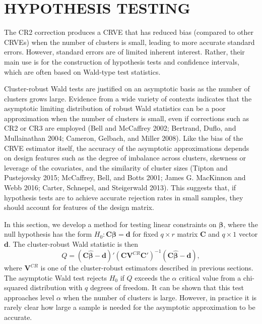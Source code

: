 \documentclass[12pt]{article}
\begin{document}
\hypertarget{sec:testing}{%
\section{HYPOTHESIS TESTING}\label{sec:testing}}

The CR2 correction produces a CRVE that has reduced bias (compared to
other CRVEs) when the number of clusters is small, leading to more
accurate standard errors. However, standard errors are of limited
inherent interest. Rather, their main use is for the construction of
hypothesis tests and confidence intervals, which are often based on
Wald-type test statistics.

Cluster-robust Wald tests are justified on an asymptotic basis as the
number of clusters grows large. Evidence from a wide variety of contexts
indicates that the asymptotic limiting distribution of robust Wald
statistics can be a poor approximation when the number of clusters is
small, even if corrections such as CR2 or CR3 are employed (Bell and
McCaffrey 2002; Bertrand, Duflo, and Mullainathan 2004; Cameron,
Gelbach, and Miller 2008). Like the bias of the CRVE estimator itself,
the accuracy of the asymptotic approximations depends on design features
such as the degree of imbalance across clusters, skewness or leverage of
the covariates, and the similarity of cluster sizes (Tipton and
Pustejovsky 2015; McCaffrey, Bell, and Botts 2001; James G. MacKinnon
and Webb 2016; Carter, Schnepel, and Steigerwald 2013). This suggests
that, if hypothesis tests are to achieve accurate rejection rates in
small samples, they should account for features of the design matrix.

In this section, we develop a method for testing linear constraints on
\(\boldsymbol\beta\), where the null hypothesis has the form
\(H_0: \mathbf{C}\boldsymbol\beta = \mathbf{d}\) for fixed
\(q \times r\) matrix \(\mathbf{C}\) and \(q \times 1\) vector
\(\mathbf{d}\). The cluster-robust Wald statistic is then
\begin{equation}
\label{eq:Wald_stat}
Q = \left(\mathbf{C}\boldsymbol{\hat\beta} - \mathbf{d}\right)'\left(\mathbf{C} \mathbf{V}^{CR} \mathbf{C}'\right)^{-1}\left(\mathbf{C}\boldsymbol{\hat\beta} - \mathbf{d}\right),
\end{equation} where \(\mathbf{V}^{CR}\) is one of the cluster-robust
estimators described in previous sections. The asymptotic Wald test
rejects \(H_0\) if \(Q\) exceeds the \(\alpha\) critical value from a
chi-squared distribution with \(q\) degrees of freedom. It can be shown
that this test approaches level \(\alpha\) when the number of clusters
is large. However, in practice it is rarely clear how large a sample is
needed for the asymptotic approximation to be accurate.
\end{document}
